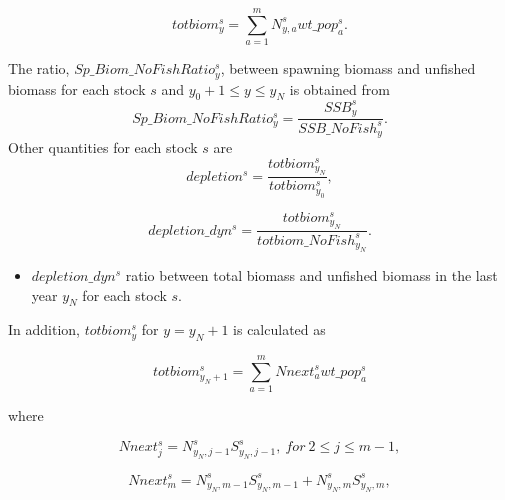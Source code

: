 \documentclass{article}
\begin{document}
\begin{equation}
    totbiom^s_y=\sum_{a=1}^m N^s_{y,a}wt\_pop^s_a.
\end{equation}

The ratio, $Sp\_Biom\_NoFishRatio^s_y$,  between spawning biomass and unfished biomass for each stock $s$ and $y_0+1\leq y \leq y_N$ is obtained from
\begin{equation}
    Sp\_Biom\_NoFishRatio^s_y=\dfrac{SSB^s_y}{SSB\_NoFish^s_y}.
\end{equation}
Other quantities for each stock $s$ are 
\begin{equation}
    depletion^s=\dfrac{totbiom^s_{y_N}}{totbiom^s_{y_0}},
\end{equation}

\begin{equation}
    depletion\_dyn^s=\dfrac{totbiom^s_{y_N}}{totbiom\_NoFish^s_{y_N}}.
\end{equation}

\begin{itemize}
    \item $depletion\_dyn^s$ ratio between total biomass and unfished biomass in the last year $y_N$ for each stock $s$.
\end{itemize}

In addition,  $totbiom^s_y$ for $y=y_N+1$ is calculated as

\begin{equation}
totbiom^s_{y_N+1}=\sum_{a=1}^m Nnext^s_a  wt\_pop^s_a
\end{equation}

where 

\begin{equation} \label{next}
Nnext^s_j=N^s_{y_N,j-1}  S^s_{y_N,j-1}, \ for \ 2\leq j\leq m-1,
\end{equation}

\begin{equation}
Nnext^s_m=N^s_{y_N,m-1}  S^s_{y_N,m-1}+N^s_{y_N,m}  S^s_{y_N,m},
\end{equation}

\end{document}
